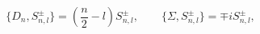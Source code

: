 \begin{equation}
\{D_n,S^\pm_{n,l}\}=\left(\frac{n}{2}-l\right)
S^\pm_{n,l},\qquad
\{\Sigma,S^\pm_{n,l}\}=\mp iS^\pm_{n,l},
\label{dsig}
\end{equation}

